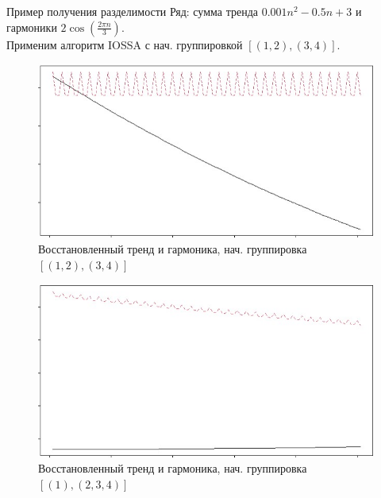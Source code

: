 \documentclass[ucs, notheorems, handout]{beamer}
\begin{document}
\begin{frame}{Пример получения разделимости}
    Ряд: сумма тренда $0.001n^2 - 0.5n + 3$ и гармоники $2 \cos(\frac{2 \pi n} {3})$.\\
    \pause
    Применим алгоритм IOSSA с нач. группировкой $[(1, 2),(3, 4)]$.
    \pause
    \begin{figure}
      \begin{minipage}[l]{0.5\textwidth}
        \includegraphics[scale = 0.33]{ssa_example6.jpg}
      \end{minipage}\hfill
      \begin{minipage}[l]{0.5\textwidth}
        \caption{
           \footnotesize Восстановленный тренд и гармоника, нач. группировка $[(1, 2), (3, 4)]$
        } \label{fig:03-03}
      \end{minipage}
    \end{figure}
    \pause
    \begin{figure}
      \begin{minipage}[l]{0.5\textwidth}
        \includegraphics[scale = 0.33]{ssa_example7.jpg}
      \end{minipage}\hfill
      \begin{minipage}[l]{0.5\textwidth}
        \caption{
           \footnotesize Восстановленный тренд и гармоника, нач. группировка $[(1), (2, 3, 4)]$
        } \label{fig:03-03}
      \end{minipage}
    \end{figure}
    

\end{frame}
\end{document}
